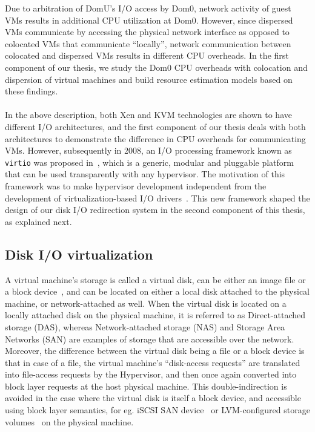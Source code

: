 Due to arbitration of DomU's I/O access by Dom0,
network activity of guest VMs results in additional
CPU utilization at Dom0. However, since dispersed VMs communicate
by accessing the physical network interface as opposed to colocated VMs
that communicate ``locally'', network communication between
colocated and dispersed VMs results in different CPU overheads.
In the first component of our thesis, we study the Dom0 CPU overheads
with colocation and dispersion of virtual machines and
build resource estimation models based on these findings.
\\
\\
In the above description, both Xen and KVM technologies are shown to 
have different I/O architectures, and the first component of our 
thesis deals with both architectures to demonstrate the difference
in CPU overheads for communicating VMs.
However, subsequently in 2008, 
an I/O processing framework known as \texttt{virtio} was 
proposed in~\cite{virtio}, which is a generic, modular and pluggable 
platform that can be used transparently with 
any hypervisor. The motivation of this framework was to
make hypervisor development
independent from the development of virtualization-based 
I/O drivers~\cite{virtio}.
This new framework shaped the design of our disk I/O redirection system
in the second component of this thesis, as explained next.

\subsection{Disk I/O virtualization}
A virtual machine's storage is called a virtual disk, can be either
an image file or a block device~\cite{ip-networked-storage}, and can be 
located on either a local disk attached to the 
physical machine, or network-attached as well.
When the virtual disk is located on a locally attached disk on the 
physical machine, it is referred to as Direct-attached 
storage (DAS),
whereas Network-attached storage (NAS) and Storage Area Networks (SAN)
are examples of storage that are accessible over the network.
Moreover, the difference between the virtual disk being a file or a
block device is that in case of a file, the virtual machine's ``disk-access
requests'' are translated into file-access requests by the Hypervisor, 
and then once again converted into block layer requests at the host
physical machine. This double-indirection is avoided in the case
where the virtual disk is itself a block device, and accessible using
block layer semantics, for 
eg. iSCSI
SAN device~\cite{iscsi} or 
LVM-configured
storage volumes~\cite{lvm} on the physical machine.


